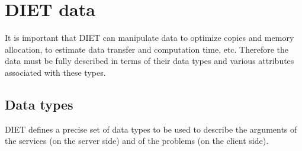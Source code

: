 
\chapter{DIET data}
\label{ch:data}

It is important that DIET can manipulate data to optimize copies and
memory allocation, to estimate data transfer and computation time,
etc. Therefore the data must be fully described in terms of their data 
types and various attributes associated with these types.

\section{Data types}
\label{sec:types}

DIET defines a precise set of data types to be used to describe the arguments of
the services (on the server side) and of the problems (on the client side).

